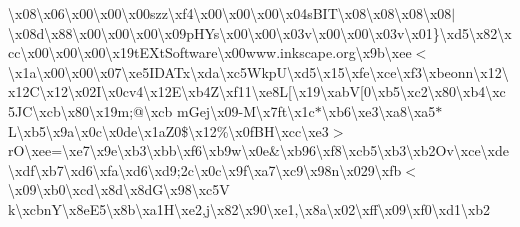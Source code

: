 \textbackslash{}x08\textbackslash{}x06\textbackslash{}x00\textbackslash{}x00\textbackslash{}x00szz\textbackslash{}xf4\textbackslash{}x00\textbackslash{}x00\textbackslash{}x00\textbackslash{}x04s\+B\+I\+T\textbackslash{}x08\textbackslash{}x08\textbackslash{}x08\textbackslash{}x08$\vert$\textbackslash{}x08d\textbackslash{}x88\textbackslash{}x00\textbackslash{}x00\textbackslash{}x00\textbackslash{}x09p\+H\+Ys\textbackslash{}x00\textbackslash{}x00\textbackslash{}x03v\textbackslash{}x00\textbackslash{}x00\textbackslash{}x03v\textbackslash{}x01\}\textbackslash{}xd5\textbackslash{}x82\textbackslash{}xcc\textbackslash{}x00\textbackslash{}x00\textbackslash{}x00\textbackslash{}x19t\+E\+Xt\+Software\textbackslash{}x00www.\+inkscape.\+org\textbackslash{}x9b\textbackslash{}xee$<$\textbackslash{}x1a\textbackslash{}x00\textbackslash{}x00\textbackslash{}x07\textbackslash{}xe5\+I\+D\+A\+Tx\textbackslash{}xda\textbackslash{}xc5\+Wkp\+U\textbackslash{}xd5\textbackslash{}x15\textbackslash{}xfe\textbackslash{}xce\textbackslash{}xf3\textbackslash{}xbeonn\textbackslash{}x12\textbackslash{}x12\+C\textbackslash{}x12\textbackslash{}x02\+I\textbackslash{}x0cv4\textbackslash{}x12\+E\textbackslash{}xb4\+Z\textbackslash{}xf11\textbackslash{}xe8\+L\mbox{[}\textbackslash{}x19\textbackslash{}xab\+V\mbox{[}0\textbackslash{}xb5\textbackslash{}xc2\textbackslash{}x80\textbackslash{}xb4\textbackslash{}xc5\+J\+C\textbackslash{}xcb\textbackslash{}x80\textbackslash{}x19m;@\textbackslash{}xcb m\+Gej\textbackslash{}x09-\/\+M\textbackslash{}x7ft\textbackslash{}x1c$\ast$\textbackslash{}xb6\textbackslash{}xe3\textbackslash{}xa8\textbackslash{}xa5$\ast$\+L\textbackslash{}xb5\textbackslash{}x9a\textbackslash{}x0c\textbackslash{}x0de\textbackslash{}x1a\+Z0\$\textbackslash{}x12\%\textbackslash{}x0f\+B\+H\textbackslash{}xcc\textbackslash{}xe3$>$r\+O\textbackslash{}xee=\textbackslash{}xe7\textbackslash{}x9e\textbackslash{}xb3\textbackslash{}xbb\textbackslash{}xf6\textbackslash{}xb9w\textbackslash{}x0e\&\textbackslash{}xb96\textbackslash{}xf8\textbackslash{}xcb5\textbackslash{}xb3\textbackslash{}xb2\+Ov\textbackslash{}xce\textbackslash{}xde\textbackslash{}xdf\textbackslash{}xb7\textbackslash{}xd6\textbackslash{}xfa\textbackslash{}xd6\textbackslash{}xd9;2c\textbackslash{}x0c\textbackslash{}x9f\textbackslash{}xa7\textbackslash{}xc9\textbackslash{}x98n\textbackslash{}x029\textbackslash{}xfb$<$\textbackslash{}x09\textbackslash{}xb0\textbackslash{}xcd\textbackslash{}x8d\textbackslash{}x8d\+G\textbackslash{}x98\textbackslash{}xc5\+V k\textbackslash{}xcbn\+Y\textbackslash{}x8e\+E5\textbackslash{}x8b\textbackslash{}xa1\+H\textbackslash{}xe2,j\textbackslash{}x82\textbackslash{}x90\textbackslash{}xe1,\textbackslash{}x8a\textbackslash{}x02\textbackslash{}xff\textbackslash{}x09\textbackslash{}xf0\textbackslash{}xd1\textbackslash{}xb2 